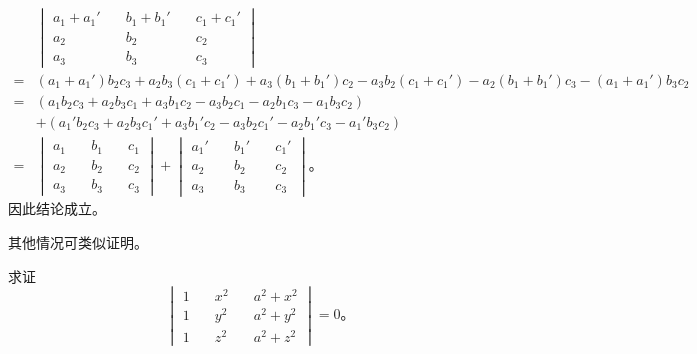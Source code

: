 \begin{align*}
    & \begin{vmatrix*}
        a_1 + a_1' \quad & b_1 + b_1' \quad & c_1 + c_1' \\
        a_2 \quad & b_2 \quad & c_2 \\
        a_3 \quad & b_3 \quad & c_3
    \end{vmatrix*} \\
    ={} & (a_1 + a_1')b_2c_3 + a_2b_3(c_1 + c_1')
         + a_3(b_1 + b_1')c_2 - a_3b_2(c_1 + c_1')
         - a_2(b_1 + b_1')c_3 - (a_1 + a_1')b_3c_2 \\
    ={} & (a_1b_2c_3 + a_2b_3c_1 + a_3b_1c_2 - a_3b_2c_1 - a_2b_1c_3 - a_1b_3c_2) \\
        & + (a_1'b_2c_3 + a_2b_3c_1' + a_3b_1'c_2 - a_3b_2c_1' - a_2b_1'c_3 - a_1'b_3c_2) \\
    ={} & \begin{vmatrix*}
            a_1 \quad & b_1 \quad & c_1 \\
            a_2 \quad & b_2 \quad & c_2 \\
            a_3 \quad & b_3 \quad & c_3
        \end{vmatrix*}
      + \begin{vmatrix*}
            a_1' \quad & b_1' \quad & c_1' \\
            a_2 \quad & b_2 \quad & c_2 \\
            a_3 \quad & b_3 \quad & c_3
        \end{vmatrix*} \text{。}
\end{align*}
因此结论成立。

其他情况可类似证明。

\liti 求证
$$
\begin{vmatrix*}
    1 \quad & x^2 \quad & a^2 + x^2 \\
    1 \quad & y^2 \quad & a^2 + y^2 \\
    1 \quad & z^2 \quad & a^2 + z^2
\end{vmatrix*} = 0 \text{。}
$$

